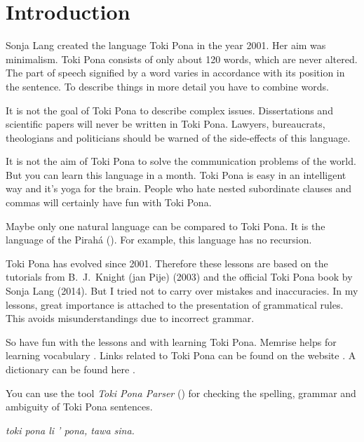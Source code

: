 \section{Introduction}
%
Sonja Lang created the language Toki Pona in the year 2001. 
Her aim was minimalism. 
Toki Pona consists of only about 120 words, which are never altered. 
The part of speech signified by a word varies in accordance with its position in the sentence. 
To describe things in more detail you have to combine words.

It is not the goal of Toki Pona to describe complex issues. 
Dissertations and scientific papers will never be written in Toki Pona. 
Lawyers, bureaucrats, theologians and politicians should be warned of the side-effects of this language.

It is not the aim of Toki Pona to solve the communication problems of the world. 
But you can learn this language in a month. 
Toki Pona is easy in an intelligent way and it's yoga for the brain. 
People who hate nested subordinate clauses and commas will certainly have fun with Toki Pona.

Maybe only one natural language can be compared to Toki Pona. 
It is the language of the Pirah\'{a} (\cite{www:piraha:01}). 
For example, this language has no recursion. 

%
%
Toki Pona has evolved since 2001. 
Therefore these lessons are based on the tutorials from B.\ J.\ Knight (jan Pije) \cite{www:Pije:01} (2003) and the official Toki Pona book \cite{www:tokipona.org} by Sonja Lang (2014). 
But I tried not to carry over mistakes and inaccuracies. 
In my lessons, great importance is attached to the presentation of grammatical rules. 
This avoids misunderstandings due to incorrect grammar.

So have fun with the lessons and with learning Toki Pona. 
Memrise helps for learning vocabulary \cite{www:memrise:01}. Links related to Toki Pona can be found on the website \cite{www:rowa:01}. 
A dictionary can be found here \cite{www:rowa:01}. 

You can use the tool \textit{Toki Pona Parser} (\cite{www:rowa:02}) for checking the spelling, grammar and ambiguity of Toki Pona sentences. 


\textit{toki pona li ' pona, tawa sina.}
%

